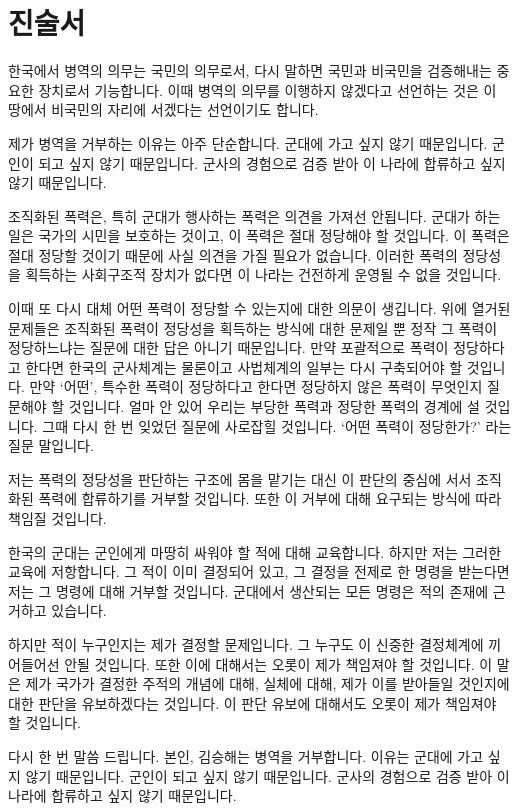 \begin{article}
\hypertarget{uxc9c4uxc220uxc11c}{%
\chapter{진술서}\label{uxc9c4uxc220uxc11c}}

한국에서 병역의 의무는 국민의 의무로서, 다시 말하면 국민과 비국민을 검증해내는 중요한 장치로서 기능합니다. 이때 병역의 의무를 이행하지 않겠다고 선언하는 것은 이 땅에서 비국민의 자리에 서겠다는 선언이기도 합니다.

제가 병역을 거부하는 이유는 아주 단순합니다. 군대에 가고 싶지 않기 때문입니다. 군인이 되고 싶지 않기 때문입니다. 군사의 경험으로 검증 받아 이 나라에 합류하고 싶지 않기 때문입니다.

조직화된 폭력은, 특히 군대가 행사하는 폭력은 의견을 가져선 안됩니다. 군대가 하는 일은 국가의 시민을 보호하는 것이고, 이 폭력은 절대 정당해야 할 것입니다. 이 폭력은 절대 정당할 것이기 때문에 사실 의견을 가질 필요가 없습니다. 이러한 폭력의 정당성을 획득하는 사회구조적 장치가 없다면 이 나라는 건전하게 운영될 수 없을 것입니다.

이때 또 다시 대체 어떤 폭력이 정당할 수 있는지에 대한 의문이 생깁니다. 위에 열거된 문제들은 조직화된 폭력이 정당성을 획득하는 방식에 대한 문제일 뿐 정작 그 폭력이 정당하느냐는 질문에 대한 답은 아니기 때문입니다. 만약 포괄적으로 폭력이 정당하다고 한다면 한국의 군사체계는 물론이고 사법체계의 일부는 다시 구축되어야 할 것입니다. 만약 `어떤', 특수한 폭력이 정당하다고 한다면 정당하지 않은 폭력이 무엇인지 질문해야 할 것입니다. 얼마 안 있어 우리는 부당한 폭력과 정당한 폭력의 경계에 설 것입니다. 그때 다시 한 번 잊었던 질문에 사로잡힐 것입니다. `어떤 폭력이 정당한가?' 라는 질문 말입니다.

저는 폭력의 정당성을 판단하는 구조에 몸을 맡기는 대신 이 판단의 중심에 서서 조직화된 폭력에 합류하기를 거부할 것입니다. 또한 이 거부에 대해 요구되는 방식에 따라 책임질 것입니다.

한국의 군대는 군인에게 마땅히 싸워야 할 적에 대해 교육합니다. 하지만 저는 그러한 교육에 저항합니다. 그 적이 이미 결정되어 있고, 그 결정을 전제로 한 명령을 받는다면 저는 그 명령에 대해 거부할 것입니다. 군대에서 생산되는 모든 명령은 적의 존재에 근거하고 있습니다.

하지만 적이 누구인지는 제가 결정할 문제입니다. 그 누구도 이 신중한 결정체계에 끼어들어선 안될 것입니다. 또한 이에 대해서는 오롯이 제가 책임져야 할 것입니다. 이 말은 제가 국가가 결정한 주적의 개념에 대해, 실체에 대해, 제가 이를 받아들일 것인지에 대한 판단을 유보하겠다는 것입니다. 이 판단 유보에 대해서도 오롯이 제가 책임져야 할 것입니다.

다시 한 번 말씀 드립니다. 본인, 김승해는 병역을 거부합니다. 이유는 군대에 가고 싶지 않기 때문입니다. 군인이 되고 싶지 않기 때문입니다. 군사의 경험으로 검증 받아 이 나라에 합류하고 싶지 않기 때문입니다.
\end{article}

